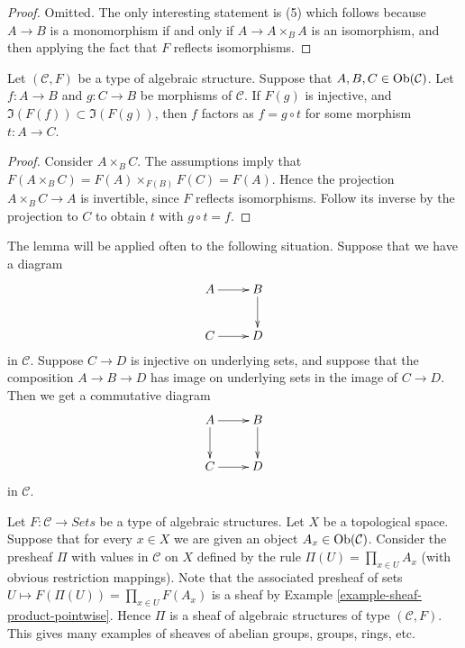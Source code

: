 \begin{proof}
Omitted. The only interesting statement is (5) which
follows because $A \to B$ is a monomorphism if and only if
$A \to A \times_B A$ is an isomorphism, and then applying
the fact that $F$ reflects isomorphisms.
\end{proof}

\begin{lemma}
\label{lemma-image-contained-in}
Let $(\mathcal{C}, F)$ be a type of algebraic structure.
Suppose that $A, B, C \in \mathop{\mathrm{Ob}}\nolimits(\mathcal{C})$.
Let $f : A \to B$ and $g : C \to B$ be morphisms of
$\mathcal{C}$. If $F(g)$ is injective, and
$\Im(F(f)) \subset \Im(F(g))$, then
$f$ factors as $f = g \circ t$ for some morphism
$t : A \to C$.
\end{lemma}

\begin{proof}
Consider $A \times_B C$. The assumptions imply that
$F(A \times_B C) = F(A) \times_{F(B)} F(C) = F(A)$.
Hence the projection $A \times_B C \to A$ is invertible, since $F$ reflects isomorphisms.
Follow its inverse by the projection to $C$ to obtain $t$ with $g \circ t = f$.
\end{proof}

\begin{example}
\label{example-application-lemma-image-contained-in}
The lemma will be applied often to the following situation.
Suppose that we have a diagram
$$
\xymatrix{
A \ar[r] & B \ar[d] \\
C \ar[r] & D
}
$$
in $\mathcal{C}$. Suppose $C \to D$ is injective on underlying
sets, and suppose that the composition $A \to B \to D$ has
image on underlying sets in the image of $C \to D$.
Then we get a commutative diagram
$$
\xymatrix{
A \ar[r] \ar[d] & B \ar[d] \\
C \ar[r] & D
}
$$
in $\mathcal{C}$.
\end{example}

\begin{example}
\label{example-sheaf-product-pointwise-algebraic-structure}
Let $F : \mathcal{C} \to \textit{Sets}$ be a
type of algebraic structures.
Let $X$ be a topological space. Suppose that
for every $x \in X$ we are given an object
$A_x \in \mathop{\mathrm{Ob}}\nolimits(\mathcal{C})$. Consider the presheaf
$\Pi$ with values in $\mathcal{C}$ on $X$ defined by the rule
$\Pi(U) = \prod_{x \in U} A_x$ (with obvious restriction
mappings). Note that the associated presheaf of sets
$U \mapsto F(\Pi(U)) = \prod_{x \in U} F(A_x)$ is a sheaf
by Example \ref{example-sheaf-product-pointwise}.
Hence $\Pi$ is a sheaf of algebraic structures
of type $(\mathcal{C} , F)$. This gives many examples
of sheaves of abelian groups, groups, rings, etc.
\end{example}













